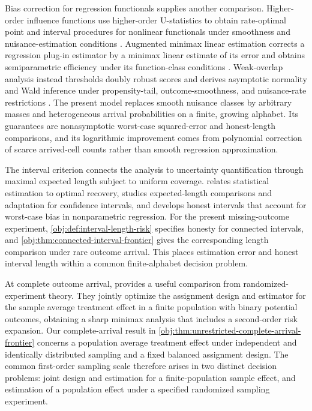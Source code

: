 \documentclass[11pt]{article}
\begin{document}
Bias correction for regression functionals supplies another comparison. Higher-order influence functions use higher-order U-statistics to obtain rate-optimal point and interval procedures for nonlinear functionals under smoothness and nuisance-estimation conditions \citep{RobinsLiTchetgenVanderVaart2008,Robins2009}. Augmented minimax linear estimation corrects a regression plug-in estimator by a minimax linear estimate of its error and obtains semiparametric efficiency under its function-class conditions \citep{Hirshberg2021}. Weak-overlap analysis instead thresholds doubly robust scores and derives asymptotic normality and Wald inference under propensity-tail, outcome-smoothness, and nuisance-rate restrictions \citep{Dorn2025}. The present model replaces smooth nuisance classes by arbitrary masses and heterogeneous arrival probabilities on a finite, growing alphabet. Its guarantees are nonasymptotic worst-case squared-error and honest-length comparisons, and its logarithmic improvement comes from polynomial correction of scarce arrived-cell counts rather than smooth regression approximation.

The interval criterion connects the analysis to uncertainty quantification through maximal expected length subject to uniform coverage. \citet{Donoho1994} relates statistical estimation to optimal recovery, \citet{Cai2004} studies expected-length comparisons and adaptation for confidence intervals, and \citet{ArmstrongKolesar2020} develops honest intervals that account for worst-case bias in nonparametric regression. For the present missing-outcome experiment, \cref{obj:def:interval-length-risk} specifies honesty for connected intervals, and \cref{obj:thm:connected-interval-frontier} gives the corresponding length comparison under rare outcome arrival. This places estimation error and honest interval length within a common finite-alphabet decision problem.

At complete outcome arrival, \citet{Sudijono2026} provides a useful comparison from randomized-experiment theory. They jointly optimize the assignment design and estimator for the sample average treatment effect in a finite population with binary potential outcomes, obtaining a sharp minimax analysis that includes a second-order risk expansion. Our complete-arrival result in \cref{obj:thm:unrestricted-complete-arrival-frontier} concerns a population average treatment effect under independent and identically distributed sampling and a fixed balanced assignment design. The common first-order sampling scale therefore arises in two distinct decision problems: joint design and estimation for a finite-population sample effect, and estimation of a population effect under a specified randomized sampling experiment.
\end{document}
